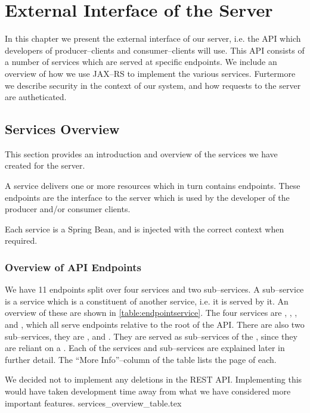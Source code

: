 \chapter{External Interface of the Server}
In this chapter we present the external interface of our server, i.e. the API which developers of producer--clients and consumer--clients will use.
This API consists of a number of services which are served at specific endpoints.
We include an overview of how we use JAX--RS to implement the various services.
Furtermore we describe security in the context of our system, and how requests to the server are autheticated.

\section{Services Overview}\label{sec:services_overview}
This section provides an introduction and overview of the services we have created for the server.

A service delivers one or more resources which in turn contains endpoints.
These endpoints are the interface to the server which is used by the developer of the producer and/or consumer clients.

Each service is a Spring Bean, and is injected with the correct context when required.

\subsection{Overview of API Endpoints}
We have 11 endpoints split over four services and two sub--services.
A sub--service is a service which is a constituent of another service, i.e. it is served by it.
An overview of these are shown in \cref{table:endpointservice}.
The four services are , , , and ,
which all serve endpoints relative to the root of the API.
There are also two sub--services, they are , and .
They are served as sub--services of the , since they are reliant on a .
Each of the services and sub--services are explained later in further detail.
The ``More Info''--column of the table lists the page of each.

We decided not to implement any deletions in the REST API.
Implementing this would have taken development time away from what we have considered more important features.
{services_overview_table.tex}

